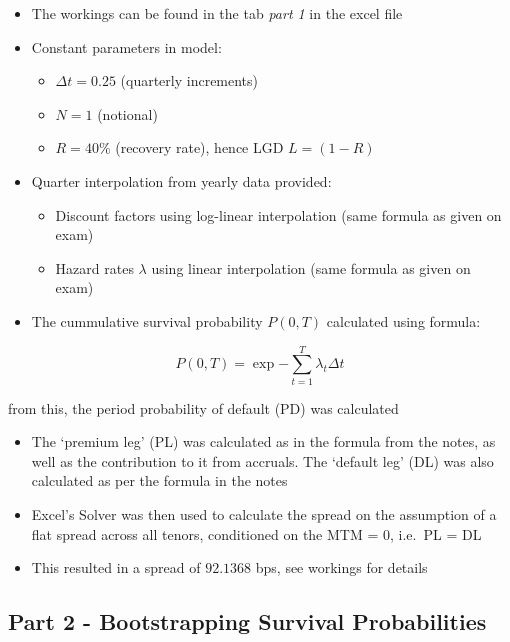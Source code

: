 \documentclass{article}
\providecommand{\tightlist}{%
      \setlength{\itemsep}{0pt}\setlength{\parskip}{0pt}}
\begin{document}
\begin{itemize}
\item
  The workings can be found in the tab \emph{part 1} in the excel file
\item
  Constant parameters in model:

  \begin{itemize}
  \tightlist
  \item
    \(\Delta t=0.25\) (quarterly increments)
  \item
    \(N=1\) (notional)
  \item
    \(R=40\%\) (recovery rate), hence LGD \(L = (1-R)\)
  \end{itemize}
\item
  Quarter interpolation from yearly data provided:

  \begin{itemize}
  \tightlist
  \item
    Discount factors using log-linear interpolation (same formula as
    given on exam)
  \item
    Hazard rates \(\lambda\) using linear interpolation (same formula as
    given on exam)
  \end{itemize}
\item
  The cummulative survival probability \(P(0, T)\) calculated using
  formula:
\end{itemize}

\[
P(0, T) = \exp{-\sum^T_{t=1} \lambda_t \Delta t}
\]

from this, the period probability of default (PD) was calculated

\begin{itemize}
\item
  The `premium leg' (PL) was calculated as in the formula from the
  notes, as well as the contribution to it from accruals. The `default
  leg' (DL) was also calculated as per the formula in the notes
\item
  Excel's Solver was then used to calculate the spread on the assumption
  of a flat spread across all tenors, conditioned on the MTM = 0,
  i.e.~PL = DL
\item
  This resulted in a spread of \(92.1368\) bps, see workings for details
\end{itemize}

    \subsection{Part 2 - Bootstrapping Survival
Probabilities}\label{part-2---bootstrapping-survival-probabilities}
\end{document}
